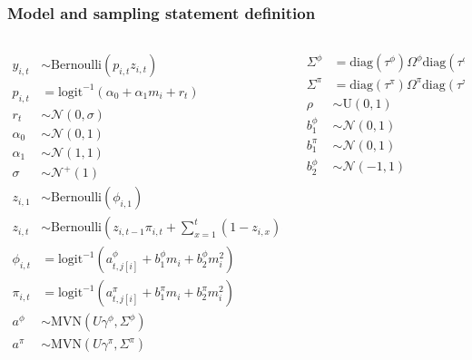 \documentclass{beamer}
\begin{document}
\begin{frame}
  \frametitle{Model and sampling statement definition}

  \begin{footnotesize}
    \begin{columns}
      \begin{column}{0.5\textwidth}
        \begin{align*}
          y_{i, t} &\sim \text{Bernoulli}(p_{i, t} z_{i, t}) \\
          p_{i, t} &= \text{logit}^{-1}(\alpha_{0} + \alpha_{1} m_{i} + r_{t}) \\ 
          r_{t} &\sim \mathcal{N}(0, \sigma) \\
          \alpha_{0} &\sim \mathcal{N}(0, 1) \\
          \alpha_{1} &\sim \mathcal{N}(1, 1) \\
          \sigma &\sim \mathcal{N}^{+}(1) \\
          z_{i, 1} &\sim \text{Bernoulli}(\phi_{i, 1}) \\
          z_{i, t} &\sim \text{Bernoulli}\left(z_{i, t - 1} \pi_{i,t} + \sum_{x = 1}^{t}(1 - z_{i, x}) \phi_{i,t}\right) \\
          \phi_{i, t} &= \text{logit}^{-1}(a^{\phi}_{t, j[i]} + b^{\phi}_{1} m_{i} + b^{\phi}_{2} m_{i}^{2}) \\
          \pi_{i, t} &= \text{logit}^{-1}(a^{\pi}_{t, j[i]} + b^{\pi}_{1} m_{i} + b^{\pi}_{2} m_{i}^{2}) \\
          a^{\phi} &\sim \text{MVN}(U \gamma^{\phi}, \Sigma^{\phi}) \\
          a^{\pi} &\sim \text{MVN}(U \gamma^{\pi}, \Sigma^{\pi}) \\
        \end{align*}
      \end{column}
      \begin{column}{0.5\textwidth}
        \begin{align*}
          \Sigma^{\phi} &= \text{diag}(\tau^{\phi}) \Omega^{\phi} \text{diag}(\tau^{\phi}) \\
          \Sigma^{\pi} &= \text{diag}(\tau^{\pi}) \Omega^{\pi} \text{diag}(\tau^{\pi}) \\
          \rho &\sim \text{U}(0, 1) \\
          b^{\phi}_{1} &\sim \mathcal{N}(0, 1) \\
          b^{\pi}_{1} &\sim \mathcal{N}(0, 1) \\
          b^{\phi}_{2} &\sim \mathcal{N}(-1, 1) \\

\end{align*}
\end{column}
\end{columns}
\end{footnotesize}
\end{frame}
\end{document}
